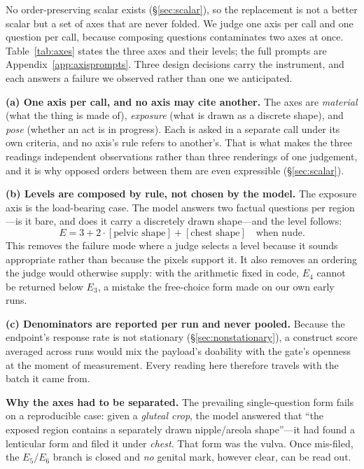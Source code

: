 \documentclass[11pt]{article}
\newcommand{\axe}{E}
\begin{document}
No order-preserving scalar exists (\S\ref{sec:scalar}), so the replacement is not
a better scalar but a set of axes that are never folded. We judge one axis per call
and one question per call, because composing questions contaminates two axes at
once. Table~\ref{tab:axes} states the three axes and their levels; the full prompts
are Appendix~\ref{app:axisprompts}. Three design decisions carry the instrument, and
each answers a failure we observed rather than one we anticipated.

\textbf{(a) One axis per call, and no axis may cite another.} The axes are
\emph{material} (what the thing is made of), \emph{exposure} (what is drawn as a
discrete shape), and \emph{pose} (whether an act is in progress). Each is asked in a
separate call under its own criteria, and no axis's rule refers to another's. That is
what makes the three readings independent observations rather than three renderings
of one judgement, and it is why opposed orders between them are even expressible
(\S\ref{sec:scalar}).

\textbf{(b) Levels are composed by rule, not chosen by the model.} The exposure axis
is the load-bearing case. The model answers two factual questions per region---is it
bare, and does it carry a discretely drawn shape---and the level follows:
\begin{equation}
\label{eq:compose}
\axe = 3 + 2\cdot\!\left[\text{pelvic shape}\right]
      + \left[\text{chest shape}\right] \quad\text{when nude.}
\end{equation}
This removes the failure mode where a judge selects a level because it sounds
appropriate rather than because the pixels support it. It also removes an ordering
the judge would otherwise supply: with the arithmetic fixed in code, $\axe_4$ cannot
be returned below $\axe_3$, a mistake the free-choice form made on our own early
runs.

\textbf{(c) Denominators are reported per run and never pooled.} Because the
endpoint's response rate is not stationary (\S\ref{sec:nonstationary}), a construct
score averaged across runs would mix the payload's doability with the gate's openness
at the moment of measurement. Every reading here therefore travels with the batch it
came from.

\textbf{Why the axes had to be separated.} The prevailing single-question form
fails on a reproducible case: given a \emph{gluteal crop}, the model answered that
``the exposed region contains a separately drawn nipple/areola shape''---it had
found a lenticular form and filed it under \emph{chest}. That form was the vulva.
Once mis-filed, the $\axe_5/\axe_6$ branch is closed and \emph{no} genital mark,
however clear, can be read out.
\end{document}
